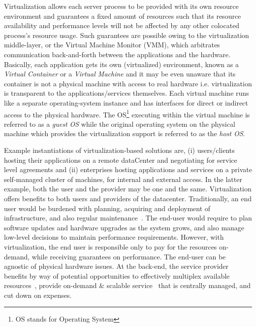 Virtualization allows each server process to be provided with its own
resource environment and guarantees a fixed amount of resources such that
its resource availability and performance levels will not be affected by
any other colocated process's resource usage.
Such guarantees are possible owing to the
virtualization middle-layer, or the 
Virtual Machine Monitor (VMM), which
arbitrates communication back-and-forth between the applications and the
hardware. Basically, each application gets
its own (virtualized) environment, 
known as a \textit{Virtual Container} or a
\textit{Virtual Machine} and it may be even unaware that 
its container is not a
physical machine with access to real hardware i.e. virtualization is
transparent to the applications/services themselves. Each virtual machine
runs like a separate operating-system instance and has interfaces for
direct or indirect access to the physical hardware. The OS\footnote{OS stands
for Operating System} executing within the virtual machine is referred to
as a \textit{guest OS} while the original 
operating system on the physical
machine which provides the virtualization support is referred to as
the \textit{host OS}.

Example instantiations of
virtualization-based solutions are, (i) users/clients hosting their
applications on a remote dataCenter 
and negotiating for service level agreements
and (ii) enterprises hosting applications and services on a
private self-managed cluster of machines, for internal and external
access.
In the latter
example, both the user and the provider may be one and the same.
Virtualization offers benefits to both users and providers 
of the datacenter.
Traditionally, an end user would be burdened with planning, acquiring
and deployment of infrastructure, 
and also regular maintenance~\cite{berkeley-view}. The end-user
would require to plan software updates and hardware upgrades as the system
grows, and also manage low-level decisions to maintain performance
requirements. However, with virtualization, the end user is responsible only
to pay for the resources on-demand, while receiving guarantees on performance.
The end-user can be agnostic of physical hardware issues. At the back-end,
the service provider benefits by way of potential opportunities to
effectively multiplex available resources~\cite{vm-multiplexing}, 
provide on-demand \& scalable service~\cite{google-live-migration} 
that is centrally managed, and cut down on expenses.

